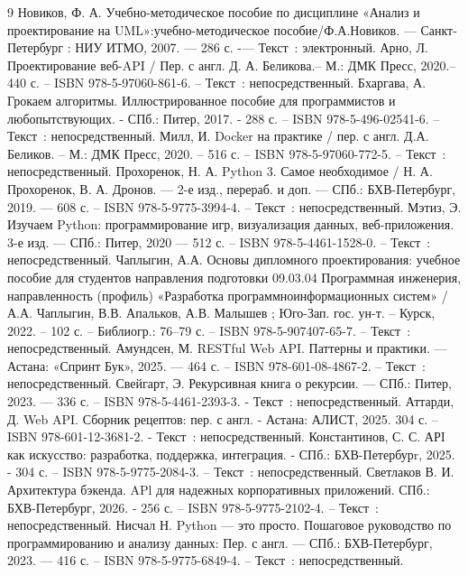 \begin{thebibliography}{9}
     Новиков, Ф. А. Учебно-методическое пособие по дисциплине «Анализ и проектирование на UML»:учебно-методическое пособие/Ф.А.Новиков. — Санкт-Петербург : НИУ ИТМО, 2007. — 286 с. -— Текст~: электронный.
     Арно, Л. Проектирование веб-API / Пер. с англ. Д. А. Беликова.– М.: ДМК Пресс, 2020.– 440 с. -- ISBN 978-5-97060-861-6. -- Текст~: непосредственный.
     Бхаргава, А. Грокаем алгоритмы. Иллюстрированное пособие для программистов и любопытствующих. - СПб.: Питер, 2017. - 288 с. -- ISBN 978-5-496-02541-6. -- Текст~: непосредственный.
     Милл, И. Docker на практике / пер. с англ. Д.А. Беликов. – М.: ДМК  Пресс, 2020. – 516 с. -- ISBN 978-5-97060-772-5. -- Текст~: непосредственный.
     Прохоренок, Н. А. Python 3. Самое необходимое / Н. А. Прохоренок, В. А. Дронов. — 2-е изд., перераб. и доп. — СПб.: БХВ-Петербург, 2019. — 608 с. -- ISBN 978-5-9775-3994-4. -- Текст~: непосредственный. 
     Мэтиз, Э. Изучаем Python: программирование игр, визуализация данных, веб-приложения. 3-е изд. — СПб.: Питер, 2020 — 512 с. -- ISBN 978-5-4461-1528-0. -- Текст~: непосредственный.
     Чаплыгин, А.А. Основы дипломного проектирования: учебное пособие для студентов направления подготовки 09.03.04 Программная инженерия, направленность (профиль) «Разработка программноинформационных систем» / А.А. Чаплыгин, В.В. Апальков, А.В. Малышев ; Юго-Зап. гос. ун-т. – Курск, 2022. – 102 с. – Библиогр.: 76–79 с. -- ISBN 978-5-907407-65-7. -- Текст~: непосредственный.
     Амундсен, М. RESTful Web API. Паттерны и практики. — Астана: «Спринт Бук», 2025. — 464 с. -- ISBN 978-601-08-4867-2. -- Текст~: непосредственный. 
     Свейгарт, Э. Рекурсивная книга о рекурсии. — СПб.: Питер, 2023. — 336 с. -- ISBN 978-5-4461-2393-3. - Текст~: непосредственный.
     Аттарди, Д. Web API. Сборник рецептов: пер. с англ. - Астана: АЛИСТ, 2025. 304 с. -- ISBN 978-601-12-3681-2. - Текст~: непосредственный. 
     Константинов, С. С. АРI как искусство: разработка, поддержка, интеграция. - СПб.: БХВ-Петербурr, 2025. - 304 с. -- ISBN 978-5-9775-2084-3. -- Текст~: непосредственный. 
     Светлаков В. И. Архитектура бэкенда. APl для надежных корпоративных приложений. СПб.: БХВ-Петербург, 2026. - 256 с. -- ISBN 978-5-9775-2102-4. -- Текст~: непосредственный. 
     Нисчал Н. Python — это просто. Пошаговое руководство по программированию и анализу данных: Пер. с англ. — СПб.: БХВ-Петербург, 2023. — 416 с. -- ISBN 978-5-9775-6849-4. -- Текст~: непосредственный.

\end{thebibliography}
